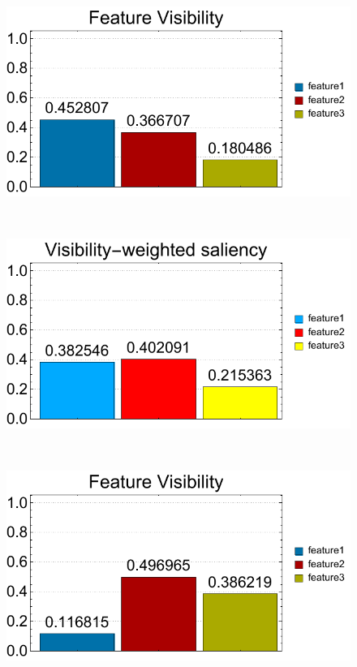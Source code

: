 \begin{figure}
	\begin{minipage}{.25\textwidth}
		\includegraphics[width=1\linewidth]{figures/tooth_naive_visibility_chart}
		\subcaption{}
	\end{minipage}~
	\begin{minipage}{.25\textwidth}
		\includegraphics[width=1\linewidth]{figures/tooth_naive_visibility_saliency_weighted_chart}
		\subcaption{}
	\end{minipage}~
	\begin{minipage}{.25\textwidth}
		\includegraphics[width=1\linewidth]{figures/tooth_naive_optimized_linesearch_visibility_chart}

\end{minipage}
\end{figure}
